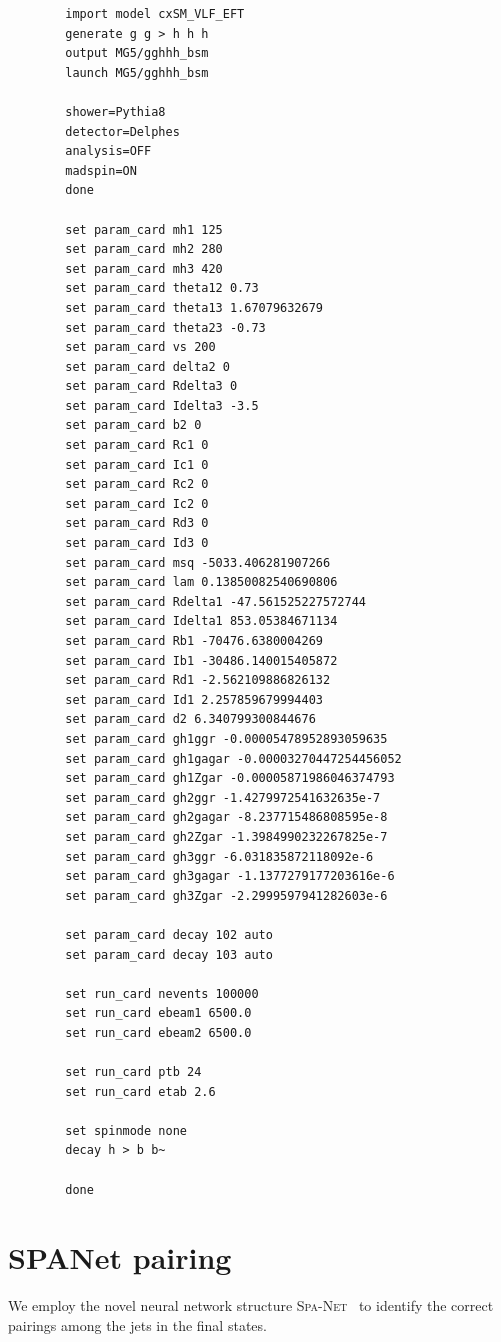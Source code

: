 \documentclass[12pt]{article}
\begin{document}
    \begin{verbatim}
        import model cxSM_VLF_EFT
        generate g g > h h h
        output MG5/gghhh_bsm
        launch MG5/gghhh_bsm

        shower=Pythia8
        detector=Delphes
        analysis=OFF
        madspin=ON
        done

        set param_card mh1 125
        set param_card mh2 280
        set param_card mh3 420
        set param_card theta12 0.73
        set param_card theta13 1.67079632679
        set param_card theta23 -0.73
        set param_card vs 200
        set param_card delta2 0
        set param_card Rdelta3 0
        set param_card Idelta3 -3.5
        set param_card b2 0
        set param_card Rc1 0
        set param_card Ic1 0
        set param_card Rc2 0
        set param_card Ic2 0
        set param_card Rd3 0
        set param_card Id3 0
        set param_card msq -5033.406281907266
        set param_card lam 0.13850082540690806
        set param_card Rdelta1 -47.561525227572744
        set param_card Idelta1 853.05384671134
        set param_card Rb1 -70476.6380004269
        set param_card Ib1 -30486.140015405872
        set param_card Rd1 -2.562109886826132
        set param_card Id1 2.257859679994403
        set param_card d2 6.340799300844676
        set param_card gh1ggr -0.00005478952893059635
        set param_card gh1gagar -0.00003270447254456052
        set param_card gh1Zgar -0.00005871986046374793
        set param_card gh2ggr -1.4279972541632635e-7
        set param_card gh2gagar -8.237715486808595e-8
        set param_card gh2Zgar -1.3984990232267825e-7
        set param_card gh3ggr -6.031835872118092e-6
        set param_card gh3gagar -1.1377279177203616e-6
        set param_card gh3Zgar -2.2999597941282603e-6

        set param_card decay 102 auto
        set param_card decay 103 auto

        set run_card nevents 100000
        set run_card ebeam1 6500.0
        set run_card ebeam2 6500.0

        set run_card ptb 24
        set run_card etab 2.6

        set spinmode none
        decay h > b b~

        done
    \end{verbatim}
\section{SPANet pairing}%
\label{sec:spanet_pairing}
    We employ the novel neural network structure \textsc{Spa-Net}~\cite{PhysRevD.105.112008, Fenton:2023ikr, 10.21468/SciPostPhys.12.5.178} to identify the correct pairings among the jets in the final states.
\end{document}
